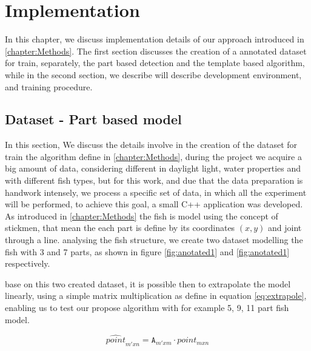 \chapter{Implementation}
\label{chapter:Implementation}

In this chapter, we discuss implementation details of our approach introduced in 
\ref{chapter:Methods}. The first section discusses the creation of a annotated dataset 
for train, separately, the part based detection and the template based algorithm, while 
in the second section, we describe will describe development environment, and  training procedure.

\section{Dataset - Part based model}
In this section, We discuss the details involve in the creation of the dataset for
train the algorithm define in \ref{chapter:Methods}, during the project we acquire
a big amount of data, considering different in daylight light, water properties and
with different fish types, but for this work, and due that the data preparation is 
handwork intensely, we process a specific set of data, in which all the experiment
will be performed, to achieve this goal, a small C++ application was developed.
As introduced in \ref{chapter:Methods} the fish is model using the concept of stickmen, that
mean the each part is define by its coordinates $(x,y)$ and joint through a line.
analysing the fish structure, we create two dataset modelling the fish with 3 and 7 parts, as shown in
figure \ref{fig:anotated1} and \ref{fig:anotated1} respectively.

base on this two created dataset, it is possible then to extrapolate the model linearly,
using a simple matrix multiplication as define in equation \ref{eq:extrapole}, enabling us to 
test our propose algorithm with for example 5, 9, 11 part fish model.


\begin{equation}
 \label{eq:extrapole}
\hat{point}_{m'xn} =\mathtt{A}_{m'xm} \cdot point_{mxn}
\end{equation}

